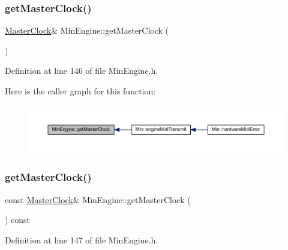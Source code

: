 \subsubsection{\texorpdfstring{get\+Master\+Clock()}{getMasterClock()}\hspace{0.1cm}{\footnotesize\ttfamily [1/2]}}
{\footnotesize\ttfamily \hyperlink{class_master_clock}{Master\+Clock}\& Min\+Engine\+::get\+Master\+Clock (\begin{DoxyParamCaption}{ }\end{DoxyParamCaption})\hspace{0.3cm}{\ttfamily [inline]}}



Definition at line 146 of file Min\+Engine.\+h.

Here is the caller graph for this function\+:
\nopagebreak
\begin{figure}[H]
\begin{center}
\leavevmode
\includegraphics[width=350pt]{d4/d0f/class_min_engine_a4d41a91ebf44df8b8d6912293a3a3452_icgraph}
\end{center}
\end{figure}
\mbox{\label{class_min_engine_a1f5e35caaf19b4a4319a5ce26dfc34b3}} 
\subsubsection{\texorpdfstring{get\+Master\+Clock()}{getMasterClock()}\hspace{0.1cm}{\footnotesize\ttfamily [2/2]}}
{\footnotesize\ttfamily const \hyperlink{class_master_clock}{Master\+Clock}\& Min\+Engine\+::get\+Master\+Clock (\begin{DoxyParamCaption}{ }\end{DoxyParamCaption}) const\hspace{0.3cm}{\ttfamily [inline]}}



Definition at line 147 of file Min\+Engine.\+h.

\mbox{\label{class_min_engine_ab6c3bb750ae223f9b31b94bb2f21f082}} 
